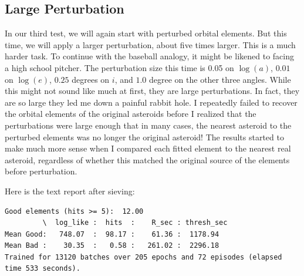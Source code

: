 \subsection{Large Perturbation}
In our third test, we will again start with perturbed orbital elements.
But this time, we will apply a larger perturbation, about five times larger.
This is a much harder task.  
To continue with the baseball analogy, it might be likened to facing a high school pitcher.
The perturbation size this time is 0.05 on $\log(a)$, $0.01$ on $\log(e)$, $0.25$ degrees on $i$, and $1.0$ degree on the other three angles.
While this might not sound like much at first, they are large perturbations.
In fact, they are so large they led me down a painful rabbit hole.
I repeatedly failed to recover the orbital elements of the original asteroids 
before I realized that the perturbations were large enough that in many cases, 
the nearest asteroid to the perturbed elements was no longer the original asteroid!
The results started to make much more sense when I compared each fitted element to the nearest real asteroid,
regardless of whether this matched the original source of the elements before perturbation.

Here is the text report after sieving:
\begin{lstlisting}[style=CodeSnippet]
Good elements (hits >= 5):  12.00
         \  log_like :  hits  :    R_sec : thresh_sec
Mean Good:   748.07  :  98.17 :    61.36 :  1178.94
Mean Bad :    30.35  :   0.58 :   261.02 :  2296.18
Trained for 13120 batches over 205 epochs and 72 episodes (elapsed time 533 seconds).
\end{lstlisting}

